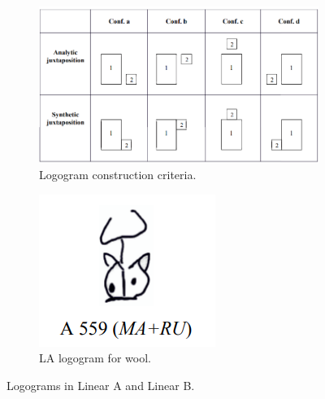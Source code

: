 \begin{figure}[H]
    \centering
    \begin{subfigure}[b]{0.6\textwidth}
        \centering
        \includegraphics[width=\textwidth]{Images/logograms.png}
        \caption{Logogram construction criteria.}
        \label{fig:logograms}
    \end{subfigure}
    \hspace{0.05\textwidth}
    \begin{subfigure}[b]{0.3\textwidth}
        \centering
        \includegraphics[width=\textwidth]{Images/ma-ru.png}
        \caption{LA logogram for wool.}
        \label{fig:ma-ru}
    \end{subfigure}
    \caption{Logograms in Linear A and Linear B.}
    \label{fig:linearA_sites}
\end{figure}

